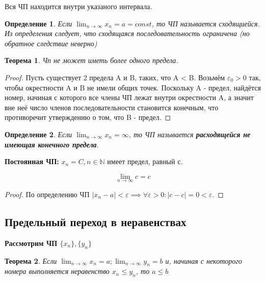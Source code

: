 \documentclass[12pt, a4paper]{article}
\newtheorem{theorem}{Теорема}[subsection]
\newtheorem{definition}{Определение}[subsection]
\theoremstyle{remark}
\newcommand{\N}{\mathbb{N}}
\newcommand{\Y}{\mathbb{\forall}}
\newcommand{\E}{\mathbb{\varepsilon}}
\begin{document}
	Вся ЧП находится внутри указаного интервала.
	\begin{definition}
		Если $\lim_{n \to \infty} x_n = a = const$, то ЧП называется сходящиейся. Из определения следует, что сходящаяся последовательность ограничена (но обратное следствие неверно)
	\end{definition}
	
	\begin{theorem}
		Чп не может иметь более одного предела.
	\end{theorem}
	
	\begin{proof}
		Пусть существует 2 предела A и B, таких, что A < B. Возьмём $\E_0 > 0$ так, чтобы окрестности A и B не имели общих точек. Поскольку A - предел, найдётся номер, начиная с которого все члены ЧП лежат внутри окрестности A, а значит вне неё число членов последовательности становится конечным, что противоречит утверждению о том, что B - предел.
	\end{proof}
	
	\begin{definition}
		Если $\lim_{n \to \infty} x_n = \infty$, то ЧП называется \textbf{расходящейся не имеющая конечного предела}.
	\end{definition}
	
	\textbf{Постоянная ЧП:} $x_n = C, n \in \N$ имеет предел, равный с.
	
	\[
	\lim_{n \to \infty} c = c
	\]
	
	\begin{proof}
		По определению ЧП $|x_n - a| < \E \implies \Y\E > 0: |c - c| = 0 < \E$.
	\end{proof}
	
	\subsection{Предельный переход в неравенствах}
	
	\textbf{Рассмотрим ЧП $\{x_n\}, \{y_n\}$}
	
	\begin{theorem}
		Если $\lim_{n \to \infty} x_n = a; \lim_{n \to \infty} y_n = b$ и, начиная с некоторого номера выполняется неравенство $x_n \leq y_n$, то $a \leq b$
	\end{theorem}
	
\end{document}
